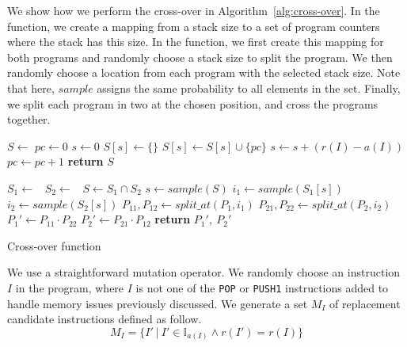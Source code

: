 We show how we perform the cross-over in Algorithm~\ref{alg:cross-over}. In the  function, we create a mapping from a stack size to a set of program counters where the stack has this size. In the  function, we first create this mapping for both programs and randomly choose a stack size to split the program. We then randomly choose a location from each program with the selected stack size. Note that here, $sample$ assigns the same probability to all elements in the set. Finally, we split each program in two at the chosen position, and cross the programs together.

\begin{algorithm}
  \begin{algorithmic}
      \State $S \gets $ 
      \State $pc \gets 0$
      \State $s \gets 0$
          \State $S[s] \gets \{\}$
        \EndIf
        \State $S[s] \gets S[s] \cup \{pc\}$
        \State $s \gets s + (r(I) - a(I))$
        \State $pc \gets pc + 1$
      \EndFor
      \State \textbf{return} $S$
    \EndFunction

      \State $S_1 \gets$~
      \State $S_2 \gets$~
      \State $S \gets S_1 \cap S_2$
      \State $s \gets sample(S)$
      \State $i_1 \gets sample(S_1[s])$
      \State $i_2 \gets sample(S_2[s])$
      \State $P_{11}, P_{12} \gets split\_at(P_1, i_1)$
      \State $P_{21}, P_{22} \gets split\_at(P_2, i_2)$
      \State $P_1' \gets P_{11}\cdot P_{22}$
      \State $P_2' \gets P_{21}\cdot P_{12}$
      \State \textbf{return} $P_1',~P_2'$
    \EndFunction
  \end{algorithmic}
  \caption{Cross-over function}
  \label{alg:cross-over}
\end{algorithm}

We use a straightforward mutation operator. We randomly choose an instruction $I$ in the program,  where $I$ is not one of the \lstinline{POP} or \lstinline{PUSH1} instructions added to handle memory issues previously discussed. We generate a set $M_I$ of replacement candidate instructions defined as follow.
\begin{equation}
  \label{ref:mutation-set}
  M_I = \{ I'~|~I'\in \mathbb{I}_{a(I)}\land r(I') = r(I) \}
\end{equation}

